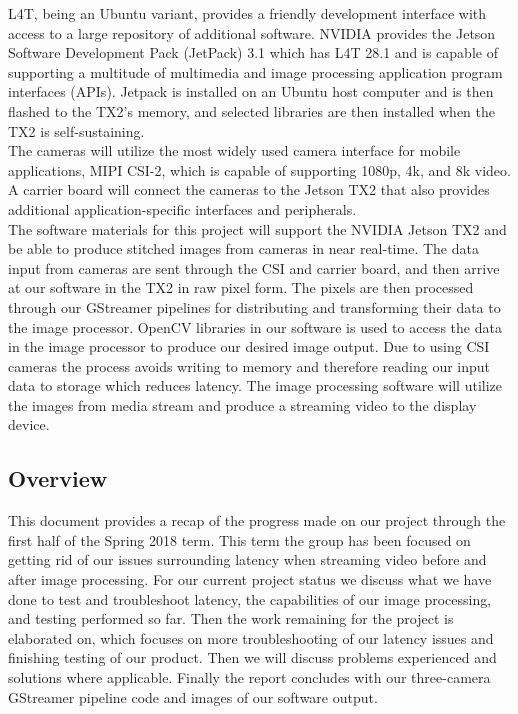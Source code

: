 \documentclass[letterpaper,10pt,serif,draftclsnofoot,onecolumn,compsoc,titlepage]{IEEEtran}
\begin{document}
L4T, being an Ubuntu variant, provides a friendly development interface with 
access to a large repository of additional software. NVIDIA provides the Jetson 
Software Development Pack (JetPack) 3.1 which has L4T 28.1 
and is capable of supporting a multitude of multimedia and image processing 
application program interfaces (APIs). Jetpack 
is installed on an Ubuntu host computer and is then flashed to the TX2's memory, and 
selected libraries are then installed when the TX2 is self-sustaining. \\

The cameras will utilize the most widely used camera interface for mobile applications, 
MIPI CSI-2, which is capable of supporting 1080p, 4k, and 8k video. 
A carrier board will connect the cameras to the Jetson TX2 that also provides 
additional application-specific interfaces and peripherals. \\

The software materials for this project will support the NVIDIA Jetson TX2 and 
be able to produce stitched images from cameras in near real-time. The data input 
from cameras are sent through the CSI and carrier board, and then arrive at our 
software in the TX2 in raw pixel form. The pixels are then processed through our 
GStreamer pipelines for distributing and transforming their data to the image 
processor. OpenCV libraries in our software is used to access the data in the image 
processor to produce our desired image output. Due to 
using CSI cameras the process avoids writing to memory and 
therefore reading our input data to storage which reduces latency. The image processing 
software will utilize the images from media stream and produce a streaming video 
to the display device.  \\

\subsection{Overview}

This document provides a recap of the progress made on our project through the first half
of the Spring 2018 term. This term the group has been focused on getting rid of our 
issues surrounding latency when streaming video before and after image processing. 
For our current project status we discuss what we have done to test and troubleshoot 
latency, the capabilities of our image processing, and testing performed so far. 
Then the work remaining for the project is elaborated on, which focuses on more 
troubleshooting of our latency issues and finishing testing of our product. Then we will 
discuss problems experienced and solutions where applicable. Finally the report concludes 
with our three-camera GStreamer pipeline code and images of our software output. \\
\end{document}
